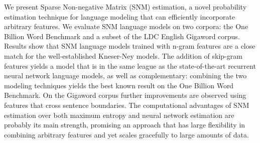 We present Sparse Non-negative Matrix (SNM) estimation, a novel probability estimation technique for language modeling that can efficiently incorporate arbitrary features. We evaluate SNM language models on two corpora: the One Billion Word Benchmark and a subset of the LDC English Gigaword corpus. Results show that SNM language models trained with n-gram features are a close match for the well-established Kneser-Ney models. The addition of skip-gram features yields a model that is in the same league as the state-of-the-art recurrent neural network language models, as well as complementary: combining the two modeling techniques yields the best known result on the One Billion Word Benchmark. On the Gigaword corpus further improvements are observed using features that cross sentence boundaries. The computational advantages of SNM estimation over both maximum entropy and neural network estimation are probably its main strength, promising an approach that has large flexibility in combining arbitrary features and yet scales gracefully to large amounts of data.
